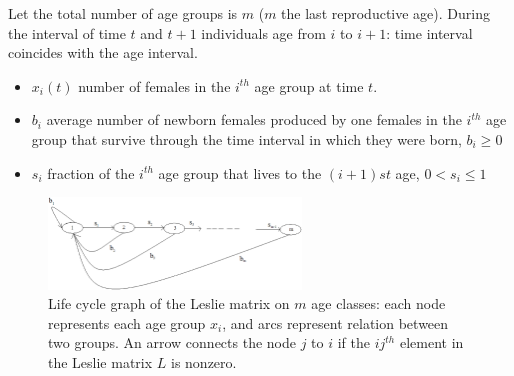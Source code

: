 Let the total number of age groups is $m$ ($m$ the last reproductive age). During the interval of time $t$ and $t+1$ individuals age from $i$ to $i+1$: time interval coincides with the age interval.
\begin{itemize}
\item $x_i(t)$ number of females in the $i^{th}$ age group at time $t$.
\item $b_i$ average number of newborn females produced by one females in the $i^{th}$ age group that survive through the time interval in which they were born, $b_i\geq 0$
\item $s_i$ fraction of the $i^{th}$ age group that lives  to the $(i+1)st$ age, $0<s_i\leq 1$
\end{itemize}
\begin{figure}
\begin{center}
\includegraphics[width=0.6\textwidth]{figs_steph/LesliePattern}
\caption{Life cycle graph of the Leslie matrix on $m$ age classes: each node represents each age group $x_i$, and arcs represent relation between two groups. An arrow connects the node $j$ to $i$ if the $ij^{th}$ element in the Leslie matrix $L$ is nonzero.}
\end{center}
\end{figure}


